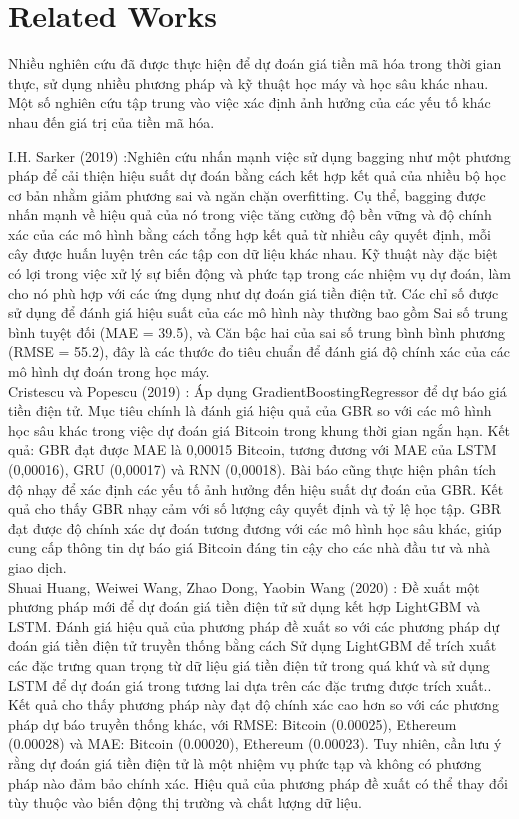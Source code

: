 \documentclass[conference]{IEEEtran}
\begin{document}
\section{Related Works}

Nhiều nghiên cứu đã được thực hiện để dự đoán giá tiền mã hóa trong thời gian thực, sử dụng nhiều phương pháp và kỹ thuật học máy và học sâu khác nhau. Một số nghiên cứu tập trung vào việc xác định ảnh hưởng của các yếu tố khác nhau đến giá trị của tiền mã hóa.

I.H. Sarker (2019) \cite{b8}:Nghiên cứu nhấn mạnh việc sử dụng bagging như một phương pháp để cải thiện hiệu suất dự đoán bằng cách kết hợp kết quả của nhiều bộ học cơ bản nhằm giảm phương sai và ngăn chặn overfitting. Cụ thể, bagging được nhấn mạnh về hiệu quả của nó trong việc tăng cường độ bền vững và độ chính xác của các mô hình bằng cách tổng hợp kết quả từ nhiều cây quyết định, mỗi cây được huấn luyện trên các tập con dữ liệu khác nhau. Kỹ thuật này đặc biệt có lợi trong việc xử lý sự biến động và phức tạp trong các nhiệm vụ dự đoán, làm cho nó phù hợp với các ứng dụng như dự đoán giá tiền điện tử. Các chỉ số được sử dụng để đánh giá hiệu suất của các mô hình này thường bao gồm Sai số trung bình tuyệt đối (MAE =  39.5), và Căn bậc hai của sai số trung bình bình phương (RMSE = 55.2), đây là các thước đo tiêu chuẩn để đánh giá độ chính xác của các mô hình dự đoán trong học máy. \\ 

Cristescu và Popescu (2019) \cite{b9}: Áp dụng GradientBoostingRegressor để dự báo giá tiền điện tử. Mục tiêu chính là đánh giá hiệu quả của GBR so với các mô hình học sâu khác trong việc dự đoán giá Bitcoin trong khung thời gian ngắn hạn. Kết quả: GBR đạt được MAE là 0,00015 Bitcoin, tương đương với MAE của LSTM (0,00016), GRU (0,00017) và RNN (0,00018). Bài báo cũng thực hiện phân tích độ nhạy để xác định các yếu tố ảnh hưởng đến hiệu suất dự đoán của GBR. Kết quả cho thấy GBR nhạy cảm với số lượng cây quyết định và tỷ lệ học tập. GBR đạt được độ chính xác dự đoán tương đương với các mô hình học sâu khác, giúp cung cấp thông tin dự báo giá Bitcoin đáng tin cậy cho các nhà đầu tư và nhà giao dịch. \\ 

Shuai Huang, Weiwei Wang, Zhao Dong, Yaobin Wang (2020) \cite{b10}: Đề xuất một phương pháp mới để dự đoán giá tiền điện tử sử dụng kết hợp LightGBM và LSTM. Đánh giá hiệu quả của phương pháp đề xuất so với các phương pháp dự đoán giá tiền điện tử truyền thống bằng cách Sử dụng LightGBM để trích xuất các đặc trưng quan trọng từ dữ liệu giá tiền điện tử trong quá khứ và sử dụng LSTM để dự đoán giá trong tương lai dựa trên các đặc trưng được trích xuất.. Kết quả cho thấy phương pháp này đạt độ chính xác cao hơn so với các phương pháp dự báo truyền thống khác, với RMSE: Bitcoin (0.00025), Ethereum (0.00028) và MAE: Bitcoin (0.00020), Ethereum (0.00023). Tuy nhiên, cần lưu ý rằng dự đoán giá tiền điện tử là một nhiệm vụ phức tạp và không có phương pháp nào đảm bảo chính xác. Hiệu quả của phương pháp đề xuất có thể thay đổi tùy thuộc vào biến động thị trường và chất lượng dữ liệu. \\
\end{document}

